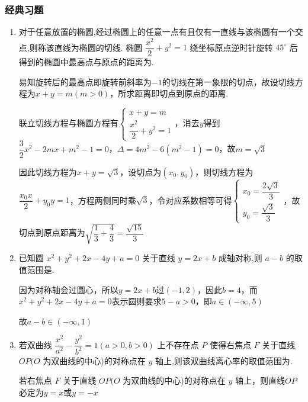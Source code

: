 \subsubsection*{经典习题}
\begin{enumerate}
    \item 对于任意放置的椭圆,经过椭圆上的任意一点有且仅有一直线与该椭圆有一个交点,则称该直线为椭圆的切线. 椭圆 $\dfrac{{x}^{2}}{2} + {y}^{2} = 1$ 绕坐标原点逆时针旋转 ${45}^{ \circ  }$ 后得到的椭圆中最高点与原点的距离为.
    \begin{jieda}
        易知旋转后的最高点即旋转前斜率为$-1$的切线在第一象限的切点，故设切线方程为$x+y = m (m > 0)$，所求距离即切点到原点的距离.

        联立切线方程与椭圆方程有$\left\{\begin{array}{l}
             x+y = m \\
             \dfrac{{x}^{2}}{2} + {y}^{2} = 1
        \end{array}\right.$，消去$y$得到$\dfrac{3}{2}x^2-2mx+m^2-1 = 0$，$\Delta = 4m^2 - 6(m^2-1) = 0$，故$m = \sqrt{3}$

        因此切线方程为$x+y = \sqrt{3}$，设切点为$(x_0, y_0)$，则切线方程为$\dfrac{x_0x}{2}+y_0y = 1$，方程两侧同时乘$\sqrt{3}$，令对应系数相等可得$\left\{\begin{array}{l}
             x_0 = \dfrac{2\sqrt{3}}{3} \\
             y_0 = \dfrac{\sqrt{3}}{3}
        \end{array}\right.$，故切点到原点距离为$\sqrt{\dfrac{1}{3}+\dfrac{4}{3}} = \dfrac{\sqrt{15}}{3}$
    \end{jieda}
    \item 已知圆 ${x}^{2} + {y}^{2} + {2x} - {4y} + a = 0$ 关于直线 $y = {2x} + b$ 成轴对称,则 $a - b$ 的取值范围是.
    \begin{jieda}
        因为对称轴会过圆心，所以$y = {2x} + b$过$(-1, 2)$，因此$b = 4$，而${x}^{2} + {y}^{2} + {2x} - {4y} + a = 0$表示圆则要求$5-a > 0$，即$a \in (-\infty, 5)$

        故$a - b \in (-\infty, 1)$
    \end{jieda}
    \item 若双曲线 $\dfrac{{x}^{2}}{{a}^{2}} - \dfrac{{y}^{2}}{{b}^{2}} = 1\left( {a > 0,b > 0}\right)$ 上不存在点 $P$ 使得右焦点 $F$ 关于直线 ${OP}(O$ 为双曲线的中心)的对称点在 $y$ 轴上,则该双曲线离心率的取值范围为\blkda{$(1, \sqrt{2}]$}.
    \begin{jieda}
        若右焦点 $F$ 关于直线 ${OP}(O$ 为双曲线的中心)的对称点在 $y$ 轴上，则直线$OP$必定为$y = x$或$y = -x$
        

\end{jieda}
\end{enumerate}

